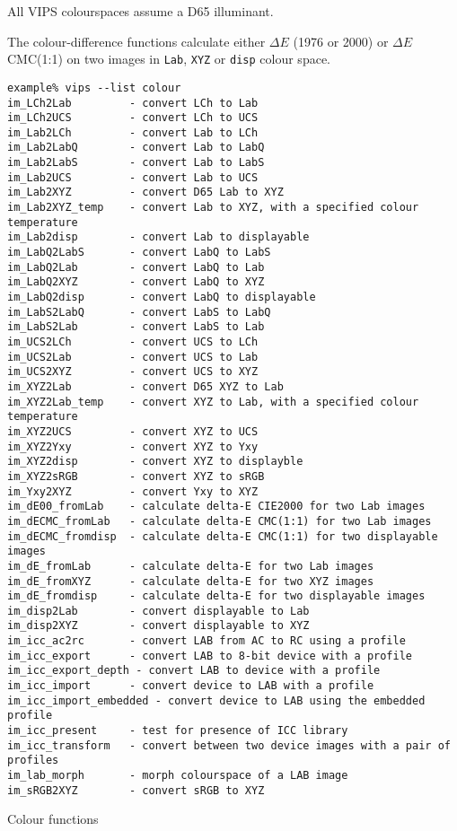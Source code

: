 All VIPS colourspaces assume a D65 illuminant.

The colour-difference functions calculate either $\Delta{}E$ \cielab{} (1976
or 2000) or $\Delta{}E$ CMC(1:1) on two images in \verb+Lab+, \verb+XYZ+ 
or \verb+disp+ colour space.

\begin{fig2}
\begin{verbatim}
example% vips --list colour
im_LCh2Lab         - convert LCh to Lab
im_LCh2UCS         - convert LCh to UCS
im_Lab2LCh         - convert Lab to LCh
im_Lab2LabQ        - convert Lab to LabQ
im_Lab2LabS        - convert Lab to LabS
im_Lab2UCS         - convert Lab to UCS
im_Lab2XYZ         - convert D65 Lab to XYZ
im_Lab2XYZ_temp    - convert Lab to XYZ, with a specified colour temperature
im_Lab2disp        - convert Lab to displayable
im_LabQ2LabS       - convert LabQ to LabS
im_LabQ2Lab        - convert LabQ to Lab
im_LabQ2XYZ        - convert LabQ to XYZ
im_LabQ2disp       - convert LabQ to displayable
im_LabS2LabQ       - convert LabS to LabQ
im_LabS2Lab        - convert LabS to Lab
im_UCS2LCh         - convert UCS to LCh
im_UCS2Lab         - convert UCS to Lab
im_UCS2XYZ         - convert UCS to XYZ
im_XYZ2Lab         - convert D65 XYZ to Lab
im_XYZ2Lab_temp    - convert XYZ to Lab, with a specified colour temperature
im_XYZ2UCS         - convert XYZ to UCS
im_XYZ2Yxy         - convert XYZ to Yxy
im_XYZ2disp        - convert XYZ to displayble
im_XYZ2sRGB        - convert XYZ to sRGB
im_Yxy2XYZ         - convert Yxy to XYZ
im_dE00_fromLab    - calculate delta-E CIE2000 for two Lab images
im_dECMC_fromLab   - calculate delta-E CMC(1:1) for two Lab images
im_dECMC_fromdisp  - calculate delta-E CMC(1:1) for two displayable images
im_dE_fromLab      - calculate delta-E for two Lab images
im_dE_fromXYZ      - calculate delta-E for two XYZ images
im_dE_fromdisp     - calculate delta-E for two displayable images
im_disp2Lab        - convert displayable to Lab
im_disp2XYZ        - convert displayable to XYZ
im_icc_ac2rc       - convert LAB from AC to RC using a profile
im_icc_export      - convert LAB to 8-bit device with a profile
im_icc_export_depth - convert LAB to device with a profile
im_icc_import      - convert device to LAB with a profile
im_icc_import_embedded - convert device to LAB using the embedded profile
im_icc_present     - test for presence of ICC library
im_icc_transform   - convert between two device images with a pair of profiles
im_lab_morph       - morph colourspace of a LAB image
im_sRGB2XYZ        - convert sRGB to XYZ
\end{verbatim}
\caption{Colour functions}
\label{fg:colour}
\end{fig2}

